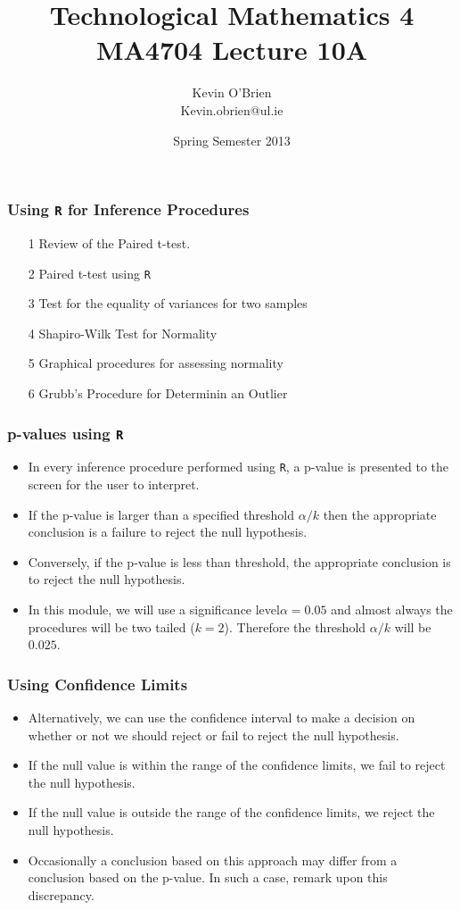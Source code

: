 \documentclass[a4]{beamer}
\title[MA4704]{Technological Mathematics 4 \\ {\normalsize MA4704 Lecture 10A}}
\author[Kevin O'Brien]{Kevin O'Brien \\ {\scriptsize Kevin.obrien@ul.ie}}
\date{Spring Semester 2013}
\institute[Maths \& Stats]{Dept. of Mathematics \& Statistics, \\ University \textit{of} Limerick}
\begin{document}
\begin{frame}
\titlepage
\end{frame}

\begin{frame}
\frametitle{Using \texttt{R} for Inference Procedures}
\begin{itemize}
\item[1] Review of the Paired t-test.
\item[2] Paired t-test using \texttt{R}
\item[3] Test for the equality of variances for two samples
\item[4] Shapiro-Wilk Test for Normality
\item[5] Graphical procedures for assessing normality
\item[6] Grubb's Procedure for Determinin an Outlier
\end{itemize}
\end{frame}
\begin{frame}
\frametitle{p-values using \texttt{R}}
\begin{itemize}
\item In every inference procedure performed using \texttt{R}, a p-value is presented to the screen for the user to interpret.

\item If the p-value is larger than a specified threshold $\alpha/k$ then the appropriate conclusion is a
failure to reject the null hypothesis.

\item Conversely, if the p-value is less than threshold, the appropriate conclusion is to reject the null hypothesis.

\item In this module, we will use a significance level$\alpha=0.05$ and almost always the procedures will be two tailed ($k=2$). Therefore the threshold $\alpha/k$ will be $0.025$.
\end{itemize}
\end{frame}

\begin{frame}
\frametitle{Using Confidence Limits}
\begin{itemize}
\item Alternatively, we can use the confidence interval to make a decision on whether or not we should reject or fail to reject the null hypothesis.
\item If the null value is within the range of the confidence limits, we fail to reject the null hypothesis.
\item If the null value is outside the range of the confidence limits, we reject the null hypothesis.
\item Occasionally a conclusion based on this approach may differ from a conclusion based on the p-value. In such a case, remark upon this discrepancy.
\end{itemize}
\end{frame}
\end{document}
